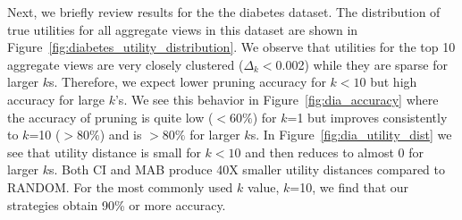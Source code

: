 
 
Next, we briefly review results for the the diabetes dataset.
The distribution of true utilities for all aggregate views in this dataset are shown in
Figure~\ref{fig:diabetes_utility_distribution}.
We observe that utilities for the top 10 aggregate views are very closely clustered ($\Delta_k<$0.002) while
they are sparse for larger $k$s.
Therefore, we expect lower pruning accuracy for $k<10$ but high accuracy for
large $k$'s.
We see this behavior in Figure~\ref{fig:dia_accuracy} where the accuracy of
pruning is quite low ($<60\%$) for $k$=1 but improves consistently to $k$=10 
($>80\%$) and is $>80\%$ for larger $k$s.
In Figure~\ref{fig:dia_utility_dist} we see that
utility distance is small for $k<10$ and then reduces to almost 0 for larger
$k$s.
Both CI and MAB produce 40X smaller utility distances compared to RANDOM.
For the most commonly used $k$ value, $k$=10, we find that our strategies obtain 
90\% or more accuracy.

